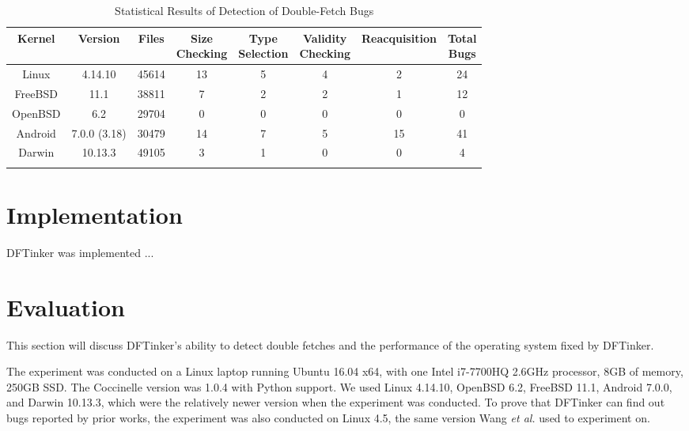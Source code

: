 \documentclass[10pt]{llncs}
\begin{document}
\begin{table}[t]
  \centering
  \caption{Statistical Results of Detection of Double-Fetch Bugs}
  \begin{tabular}{cccccccc}
    \hline
    Kernel & Version & Files & \makecell{Size \\ Checking} & \makecell{Type \\ Selection} & \makecell{Validity \\ Checking} & Reacquisition & \makecell{Total \\ Bugs}\\    
    \hline
    Linux & 4.14.10 & 45614 & 13 & 5 & 4 & 2 & 24 \\
    FreeBSD & 11.1 & 38811 & 7 & 2 & 2 & 1 & 12 \\
    OpenBSD & 6.2 & 29704 & 0 & 0 & 0 & 0 & 0 \\
    Android & 7.0.0 (3.18) & 30479 & 14 & 7 & 5 & 15 & 41 \\
    Darwin & 10.13.3 & 49105 & 3 & 1 & 0 & 0 & 4 \\
    \hline
    \label{stat}
  \end{tabular}
\end{table}




\section{Implementation}%
\label{imple}

DFTinker was implemented ...





\section{Evaluation}%
\label{evalue}
This section will discuss DFTinker's ability to detect double fetches and the performance of the operating system fixed by DFTinker.

The experiment was conducted on a Linux laptop running Ubuntu 16.04 x64, with one Intel i7-7700HQ 2.6GHz processor, 8GB of memory, 250GB SSD. The Coccinelle version was 1.0.4 with Python support. We used Linux 4.14.10, OpenBSD 6.2, FreeBSD 11.1, Android 7.0.0, and Darwin 10.13.3, which were the relatively newer version when the experiment was conducted. To prove that DFTinker can find out bugs reported by prior works, the experiment was also conducted on Linux 4.5, the same version Wang \textit{et al.} used to experiment on.
\end{document}
